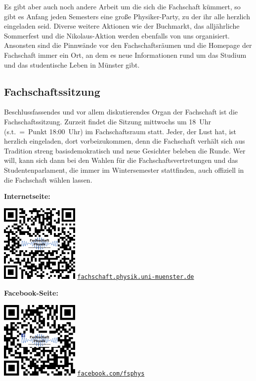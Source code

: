 \begin{multicols}{2}
Es gibt aber auch noch andere Arbeit um die sich die Fachschaft kümmert, so gibt es Anfang jeden Semesters eine große Physiker-Party, zu der ihr alle herzlich eingeladen seid. Diverse weitere Aktionen wie der Buchmarkt, das alljährliche Sommerfest und die Nikolaus-Aktion werden ebenfalls von uns organisiert. Ansonsten sind die Pinnwände vor den Fachschaftsräumen und die Homepage der Fachschaft immer ein Ort, an dem es neue Informationen rund um das Studium und das studentische Leben in Münster gibt.

\subsection*{Fachschaftssitzung}
Beschlussfassendes und vor allem diskutierendes Organ der Fachschaft ist die Fachschaftssitzung. Zurzeit findet die Sitzung mittwochs um 18~Uhr (s.t.~=~Punkt 18:00~Uhr) im Fachschaftsraum statt.
Jeder, der Lust hat, ist herzlich eingeladen, dort vorbeizukommen, denn die Fachschaft verhält sich aus Tradition streng basisdemokratisch und neue Gesichter beleben die Runde. Wer will, kann sich dann bei den Wahlen für die Fachschaftsvertretungen und das Studentenparlament, die immer im Wintersemester stattfinden, auch offiziell in die Fachschaft wählen lassen.

\begin{minipage}{\columnwidth}
	\begin{minipage}[t]{5cm}
	\raggedright\parskip=0.1cm
	\textbf{Internetseite:}

	\includegraphics[width=3.8cm]{res/fsphys_qrcode_homepage.png}
	\scriptsize
	\href{https://www.uni-muenster.de/Physik.FSPHYS}{\texttt{fachschaft.physik.uni-muenster.de}}
	\end{minipage}
	\hfill
	\begin{minipage}[t]{4cm}
	\raggedleft\parskip=0.1cm
	\textbf{Facebook-Seite:}

	\includegraphics[width=3.8cm]{res/fsphys_qrcode_facebook.png}
	\scriptsize
	\href{https://facebook.com/fsphys}{\texttt{facebook.com/fsphys}}
	\end{minipage}
\end{minipage}
\end{multicols}
